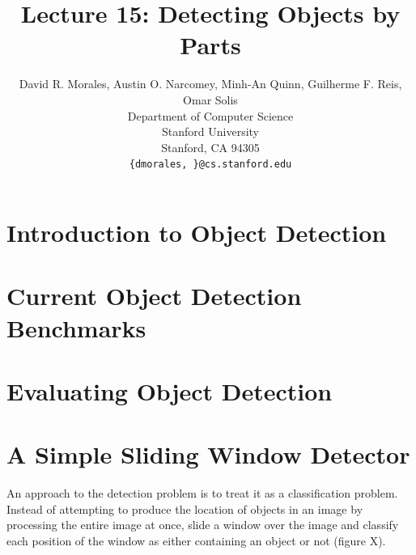 \documentclass{article}
\title{Lecture 15: Detecting Objects by Parts}
\author{
  David R. Morales, Austin O. Narcomey, Minh-An Quinn, Guilherme F. Reis, Omar Solis \\
  Department of Computer Science\\
  Stanford University\\
  Stanford, CA 94305 \\
  \texttt{\{dmorales, \}@cs.stanford.edu} \\
}
\begin{document}
\maketitle


\section{Introduction to Object Detection}

\section{Current Object Detection Benchmarks}

\section{Evaluating Object Detection}

\section{A Simple Sliding Window Detector}
An approach to the detection problem is to treat it as a classification problem. Instead of attempting to produce the location of objects in an image by processing the entire image at once, slide a window over the image and classify each position of the window as either containing an object or not (figure X).
\end{document}
